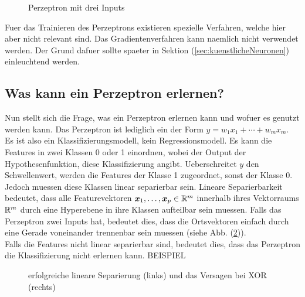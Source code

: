 \para{}
\begin{figure}[h!]
  \centering
  \caption{Perzeptron mit drei Inputs}
  \label{fi:perzeptron}
\end{figure}
\para{}
Fuer das Trainieren des Perzeptrons existieren spezielle Verfahren, welche hier
aber nicht relevant sind. Das Gradientenverfahren kann naemlich nicht verwendet
werden. Der Grund dafuer sollte spaeter in Sektion (\ref{sec:kuenstlicheNeuronen}) einleuchtend werden.

\subsection{Was kann ein Perzeptron erlernen?}
Nun stellt sich die Frage, was ein Perzeptron erlernen kann und wofuer es genutzt werden kann.
Das Perzeptron ist lediglich ein  der Form
$y = w_1x_1 + \cdots + w_m x_m$. Es ist also ein Klassifizierungsmodell, kein Regressionsmodell.
Es kann die Features in zwei Klassen 0 oder 1 einordnen, wobei der Output der
Hypothesenfunktion, diese Klassifizierung angibt.
Ueberschreitet $y$ den Schwellenwert, werden die Features der Klasse 1 zugeordnet, sonst
der Klasse 0.
Jedoch muessen diese Klassen linear separierbar sein.
\para{}
Lineare Separierbarkeit bedeutet, dass alle Featurevektoren $\bm{x}_1,\ldots,\bm{x}_p \in \mathbb{R}^m$
innerhalb ihres Vektorraums $\mathbb{R}^m$ durch eine Hyperebene in ihre Klassen aufteilbar sein muessen.
Falls das Perzeptron zwei Inputs hat, bedeutet dies, dass die Ortsvektoren
einfach durch eine Gerade voneinander trennenbar sein muessen (siehe Abb.
(\ref{fig:linearer_Klassifikator})). \\
Falls die Features nicht linear separierbar sind, bedeutet dies, dass das
Perzeptron die Klassifizierung nicht erlernen kann.
BEISPIEL
\\
\begin{figure}[h!]
  \caption{erfolgreiche lineare Separierung (links) und das Versagen bei XOR (rechts)}
  \label{fig:linearer_Klassifikator}
\end{figure}
\para{}
\cite{wiki:perzeptron}
\cite{wiki:linear_separability}

